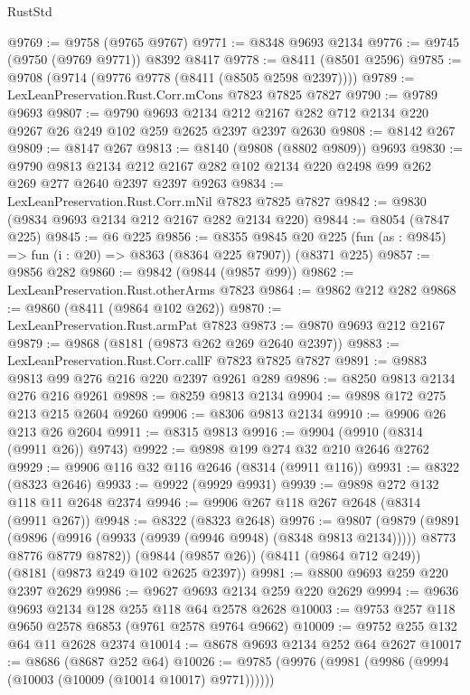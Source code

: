 \begin{lexlean}{RustStd}
\begin{coremodule}
@9769 := @9758 (@9765 @9767)
@9771 := @8348 @9693 @2134
@9776 := @9745 (@9750 (@9769 @9771)) @8392 @8417
@9778 := @8411 (@8501 @2596)
@9785 := @9708 (@9714 (@9776 @9778 (@8411 (@8505 @2598 @2397))))
@9789 := LexLeanPreservation.Rust.Corr.mCons @7823 @7825 @7827
@9790 := @9789 @9693
@9807 := @9790
    @9693
    @2134
    @212
    @2167
    @282
    @712
    @2134
    @220
    @9267
    @26
    @249
    @102
    @259
    @2625
    @2397
    @2397
    @2630
@9808 := @8142 @267
@9809 := @8147 @267
@9813 := @8140 (@9808 (@8802 @9809)) @9693
@9830 := @9790
    @9813
    @2134
    @212
    @2167
    @282
    @102
    @2134
    @220
    @2498
    @99
    @262
    @269
    @277
    @2640
    @2397
    @2397
    @9263
@9834 := LexLeanPreservation.Rust.Corr.mNil @7823 @7825 @7827
@9842 := @9830 (@9834 @9693 @2134 @212 @2167 @282 @2134 @220)
@9844 := @8054 (@7847 @225)
@9845 := @6 @225
@9856 := @8355
    @9845
    @20
    @225
    (fun (as : @9845) => fun (i : @20) => @8363 (@8364 @225 @7907))
    (@8371 @225)
@9857 := @9856 @282
@9860 := @9842 (@9844 (@9857 @99))
@9862 := LexLeanPreservation.Rust.otherArms @7823
@9864 := @9862 @212 @282
@9868 := @9860 (@8411 (@9864 @102 @262))
@9870 := LexLeanPreservation.Rust.armPat @7823
@9873 := @9870 @9693 @212 @2167
@9879 := @9868 (@8181 (@9873 @262 @269 @2640 @2397))
@9883 := LexLeanPreservation.Rust.Corr.callF @7823 @7825 @7827
@9891 := @9883 @9813 @99 @276 @216 @220 @2397 @9261 @289
@9896 := @8250 @9813 @2134 @276 @216 @9261
@9898 := @8259 @9813 @2134
@9904 := @9898 @172 @275 @213 @215 @2604 @9260
@9906 := @8306 @9813 @2134
@9910 := @9906 @26 @213 @26 @2604
@9911 := @8315 @9813
@9916 := @9904 (@9910 (@8314 (@9911 @26)) @9743)
@9922 := @9898 @199 @274 @32 @210 @2646 @2762
@9929 := @9906 @116 @32 @116 @2646 (@8314 (@9911 @116))
@9931 := @8322 (@8323 @2646)
@9933 := @9922 (@9929 @9931)
@9939 := @9898 @272 @132 @118 @11 @2648 @2374
@9946 := @9906 @267 @118 @267 @2648 (@8314 (@9911 @267))
@9948 := @8322 (@8323 @2648)
@9976 := @9807
    (@9879
      (@9891
        (@9896 (@9916 (@9933 (@9939 (@9946 @9948) (@8348 @9813 @2134)))))
        @8773
        @8776
        @8779
        @8782))
    (@9844 (@9857 @26))
    (@8411 (@9864 @712 @249))
    (@8181 (@9873 @249 @102 @2625 @2397))
@9981 := @8800 @9693 @259 @220 @2397 @2629
@9986 := @9627 @9693 @2134 @259 @220 @2629
@9994 := @9636 @9693 @2134 @128 @255 @118 @64 @2578 @2628
@10003 := @9753 @257 @118 @9650 @2578 @6853 (@9761 @2578 @9764 @9662)
@10009 := @9752 @255 @132 @64 @11 @2628 @2374
@10014 := @8678 @9693 @2134 @252 @64 @2627
@10017 := @8686 (@8687 @252 @64)
@10026 := @9785 (@9976 (@9981 (@9986 (@9994 (@10003 (@10009 (@10014 @10017) @9771))))))

\end{coremodule}
\end{lexlean}
